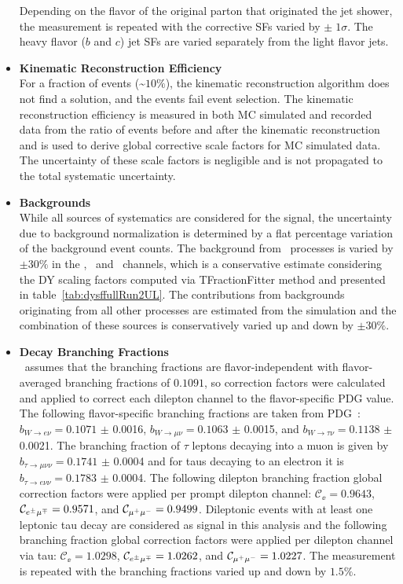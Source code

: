 \begin{itemize}
    Depending on the flavor of the original parton that originated the jet shower, the measurement is repeated with the corrective SFs varied by $\pm \; 1 \sigma$.
    The heavy flavor ($b$ and $c$) jet SFs are varied separately from the light flavor jets.
    \item {\bf Kinematic Reconstruction Efficiency} \\
    For a fraction of events (\sim$10 \%$), the kinematic reconstruction algorithm does not find a solution, and the events fail event selection.
    The kinematic reconstruction efficiency is measured in both MC simulated and recorded data from the ratio of events before and after the kinematic reconstruction and is used to derive global corrective scale factors for MC simulated data.
    The uncertainty of these scale factors is negligible and is not propagated to the total systematic uncertainty.
    \item {\bf Backgrounds} \\
    While all sources of systematics are considered for the signal, the uncertainty due to background normalization is determined by a flat percentage variation of the background event counts.
    The background from \zjets\ processes is varied by $\pm 30\%$ in the \ee, \emu\ and \mumu\ channels, which is a conservative estimate considering the DY scaling factors computed via TFractionFitter method and presented in table~\ref{tab:dysffullRun2UL}. 
    The contributions from backgrounds originating from all other processes are estimated from the simulation and the combination of these sources is conservatively varied up and down by $\pm 30\%$.
    \item {\bf Decay Branching Fractions} \\
    \Powheg\ assumes that the \ttbar branching fractions are flavor-independent with flavor-averaged branching fractions of $0.1091$, so correction factors were calculated and applied to correct each dilepton channel to the flavor-specific PDG value.
    The following flavor-specific branching fractions are taken from PDG~\cite{bib:PDG}: $b_{{\ensuremath{W\to e\nu}}} = 0.1071$ $\pm$ 0.0016, $b_{{\ensuremath{W\to \mu\nu}}} = 0.1063$ $\pm$ 0.0015, and $b_{{\ensuremath{W\to \tau\nu}}} = 0.1138$ $\pm$ 0.0021.
    The branching fraction of $\tau$ leptons decaying into a muon is given by $b_{{\ensuremath{\tau\to \mu\nu\nu}}} = 0.1741$ $\pm$ 0.0004 and for taus decaying to an electron it is $b_{{\ensuremath{\tau\to e\nu\nu}}} = 0.1783$ $\pm$ 0.0004.
    The following \ttbar dilepton branching fraction global correction factors were applied per prompt dilepton channel: $\mathcal{C}_{\ee} = 0.9643$, $\mathcal{C}_{e^{\pm}\mu^{\mp}} = 0.9571$, and $\mathcal{C}_{\mu^{+}\mu^{-}} = 0.9499$.  
    Dileptonic \ttbar events with at least one leptonic tau decay are considered as signal in this analysis and the following branching fraction global correction factors were applied per dilepton channel via tau: $\mathcal{C}_{\ee} = 1.0298$, $\mathcal{C}_{e^{\pm}\mu^{\mp}} = 1.0262$, and $\mathcal{C}_{\mu^{+}\mu^{-}} = 1.0227$.
    The measurement is repeated with the branching fractions varied up and down by $1.5 \%$.
\end{itemize}

